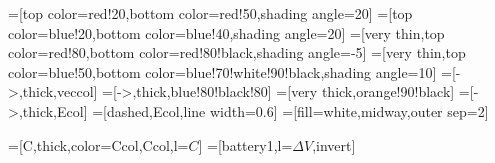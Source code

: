 \usepackage{bm}
\usepackage{physics}
\usepackage{tikz,pgfplots}
\usetikzlibrary{angles,quotes} %
\usetikzlibrary{decorations.markings}
\usetikzlibrary{calc}
\tikzset{>=latex} %

\usepackage{xcolor}
=[top color=red!20,bottom color=red!50,shading angle=20]
=[top color=blue!20,bottom color=blue!40,shading angle=20]
=[very thin,top color=red!80,bottom color=red!80!black,shading angle=-5]
=[very thin,top color=blue!50,bottom color=blue!70!white!90!black,shading angle=10]
=[->,thick,veccol]
=[->,thick,blue!80!black!80]
=[very thick,orange!90!black]
=[->,thick,Ecol]
=[dashed,Ecol,line width=0.6]
=[fill=white,midway,outer sep=2]




\usepackage{tikz,pgfplots}
\usepackage[siunitx]{circuitikz} %
\usepackage{xcolor}
\tikzset{>=latex} %
=[C,thick,color=Ccol,Ccol,l=$C$]
=[battery1,l=$\Delta V$,invert]


